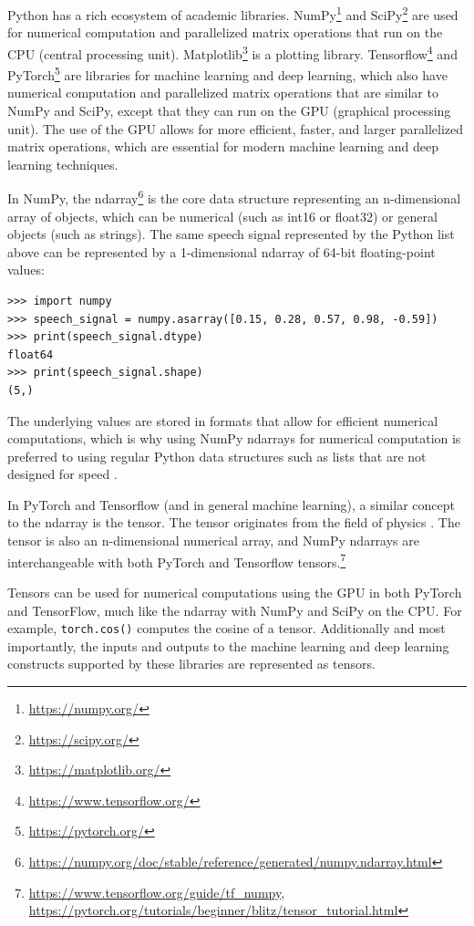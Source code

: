 \documentclass[report.tex]{subfiles}
\begin{document}
Python has a rich ecosystem of academic libraries. NumPy\footnote{\url{https://numpy.org/}} and SciPy\footnote{\url{https://scipy.org/}} are used for numerical computation and parallelized matrix operations that run on the CPU (central processing unit). Matplotlib\footnote{\url{https://matplotlib.org/}} is a plotting library. Tensorflow\footnote{\url{https://www.tensorflow.org/}} and PyTorch\footnote{\url{https://pytorch.org/}} are libraries for machine learning and deep learning, which also have numerical computation and parallelized matrix operations that are similar to NumPy and SciPy, except that they can run on the GPU (graphical processing unit). The use of the GPU allows for more efficient, faster, and larger parallelized matrix operations, which are essential for modern machine learning and deep learning techniques.

In NumPy, the ndarray\footnote{\url{https://numpy.org/doc/stable/reference/generated/numpy.ndarray.html}} is the core data structure representing an n-dimensional array of objects, which can be numerical (such as int16 or float32) or general objects (such as strings). The same speech signal represented by the Python list above can be represented by a 1-dimensional ndarray of 64-bit floating-point values:

\begin{listing}[!ht]
\centering
\begin{BVerbatim}
>>> import numpy
>>> speech_signal = numpy.asarray([0.15, 0.28, 0.57, 0.98, -0.59])
>>> print(speech_signal.dtype)
float64
>>> print(speech_signal.shape)
(5,)
\end{BVerbatim}
\end{listing}

The underlying values are stored in formats that allow for efficient numerical computations, which is why using NumPy ndarrays for numerical computation is preferred to using regular Python data structures such as lists that are not designed for speed \parencite{ndarrayfast}.

In PyTorch and Tensorflow (and in general machine learning), a similar concept to the ndarray is the tensor. The tensor originates from the field of physics \parencite{whatistensor}. The tensor is also an n-dimensional numerical array, and NumPy ndarrays are interchangeable with both PyTorch and Tensorflow tensors.\footnote{\url{https://www.tensorflow.org/guide/tf_numpy}, \url{https://pytorch.org/tutorials/beginner/blitz/tensor_tutorial.html}}

Tensors can be used for numerical computations using the GPU in both PyTorch and TensorFlow, much like the ndarray with NumPy and SciPy on the CPU. For example, \Verb#torch.cos()# computes the cosine of a tensor. Additionally and most importantly, the inputs and outputs to the machine learning and deep learning constructs supported by these libraries are represented as tensors.
\end{document}
